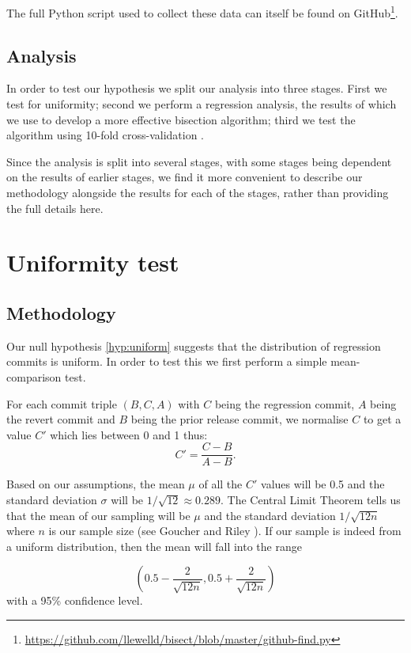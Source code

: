 \documentclass[pdflatex, sn-mathphys, referee]{sn-jnl}%
\theoremstyle{thmstyleone}%
\theoremstyle{thmstyletwo}%
\theoremstyle{thmstylethree}%
\theoremstyle{thmstyleone}
\begin{document}
The full Python script used to collect these data can itself be found on GitHub\footnote{\url{https://github.com/llewelld/bisect/blob/master/github-find.py}}.

\subsection{Analysis}

In order to test our hypothesis we split our analysis into three stages. First we test for uniformity; second we perform a regression analysis, the results of which we use to develop a more effective bisection algorithm; third we test the algorithm using 10-fold cross-validation \cite{james2013}.

Since the analysis is split into several stages, with some stages being dependent on the results of earlier stages, we find it more convenient to describe our methodology alongside the results for each of the stages, rather than providing the full details here.

\section{Uniformity test}
\label{section-uniformity}

\subsection{Methodology}

Our null hypothesis \ref{hyp:uniform} suggests that the distribution of regression commits is uniform. In order to test this we first perform a simple mean-comparison test.

For each commit triple $(B, C, A)$ with $C$ being the regression commit, $A$ being the revert commit and $B$ being the prior release commit, we normalise $C$ to get a value $C'$ which lies between 0 and 1 thus:
$$
C' = \frac{C - B}{A - B} .
$$

Based on our assumptions, the mean $\mu$ of all the $C'$ values will be 0.5 and the standard deviation $\sigma$ will be $1 / \sqrt{12} \approx 0.289$. The Central Limit Theorem tells us that the mean of our sampling will be $\mu$ and the standard deviation $1 / \sqrt{12 n}$ where $n$ is our sample size (see Goucher and Riley \cite{goucher2009}). If our sample is indeed from a uniform distribution, then the mean will fall into the range

$$
\left( 0.5 - \frac{2}{\sqrt{12 n}}, 0.5 + \frac{2}{\sqrt{12 n}} \right)
$$
with a 95\% confidence level.
\end{document}
